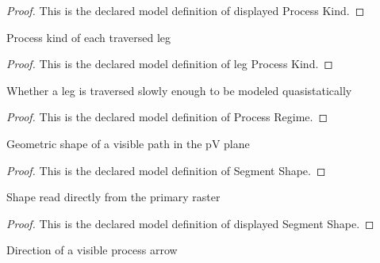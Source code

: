\begin{proof}
  This is the declared model definition of displayed Process Kind.
\end{proof}
\begin{definition}
  \label{def:physics:phyx-mini-0491:phyxminiproblems-problemphyxmini0491-legprocesskind}
  Process kind of each traversed leg
\end{definition}
\begin{proof}
  This is the declared model definition of leg Process Kind.
\end{proof}
\begin{definition}
  \label{def:physics:phyx-mini-0491:phyxminiproblems-problemphyxmini0491-processregime}
  Whether a leg is traversed slowly enough to be modeled quasistatically
\end{definition}
\begin{proof}
  This is the declared model definition of Process Regime.
\end{proof}
\begin{definition}
  \label{def:physics:phyx-mini-0491:phyxminiproblems-problemphyxmini0491-segmentshape}
  Geometric shape of a visible path in the pV plane
\end{definition}
\begin{proof}
  This is the declared model definition of Segment Shape.
\end{proof}
\begin{definition}
  \label{def:physics:phyx-mini-0491:phyxminiproblems-problemphyxmini0491-displayedsegmentshape}
  Shape read directly from the primary raster
\end{definition}
\begin{proof}
  This is the declared model definition of displayed Segment Shape.
\end{proof}
\begin{definition}
  \label{def:physics:phyx-mini-0491:phyxminiproblems-problemphyxmini0491-arrowdirection}
  Direction of a visible process arrow
\end{definition}
